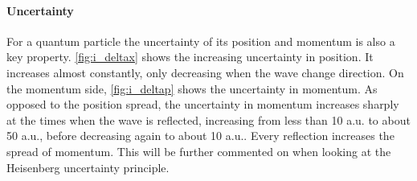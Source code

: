 \paragraph{Uncertainty} For a quantum particle the uncertainty of its position and momentum is also a key property. \autoref{fig:i_deltax} shows the increasing uncertainty in position. It increases almost constantly, only decreasing when the wave change direction. On the momentum side, \autoref{fig:i_deltap} shows the uncertainty in momentum. As opposed to the position spread, the uncertainty in momentum increases sharply at the times when the wave is reflected, increasing from less than 10 a.u. to about 50 a.u., before decreasing again to about 10 a.u.. Every reflection increases the spread of momentum. This will be further commented on when looking at the Heisenberg uncertainty principle.

